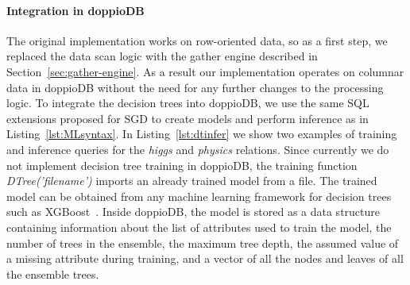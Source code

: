 \documentclass[11pt,dvipdfm]{article}
\begin{document}



\paragraph{\textbf{Integration in doppioDB}}

The original implementation works on row-oriented data, so as a first step, we replaced the data scan logic with the gather engine described in Section~\ref{sec:gather-engine}. As a result our implementation operates on columnar data in doppioDB without the need for any further changes to the processing logic. 
To integrate the decision trees into doppioDB, we use the same SQL extensions proposed for SGD to create models and perform inference as in Listing~\ref{lst:MLsyntax}. In Listing~\ref{lst:dtinfer} we show two examples of training and inference queries for the \emph{higgs} and \emph{physics} relations.
Since currently we do not implement decision tree training in doppioDB, the training function \emph{DTree('filename')} imports an already trained model from a file. The trained model can be obtained from any machine learning framework for decision trees such as XGBoost~\cite{chenkdd2016}. Inside doppioDB, the model is stored as a data structure containing information about the list of attributes used to train the model, the number of trees in the ensemble, the maximum tree depth, the assumed value of a missing attribute during training, and a vector of all the nodes and leaves of all the ensemble trees. 
\end{document}
